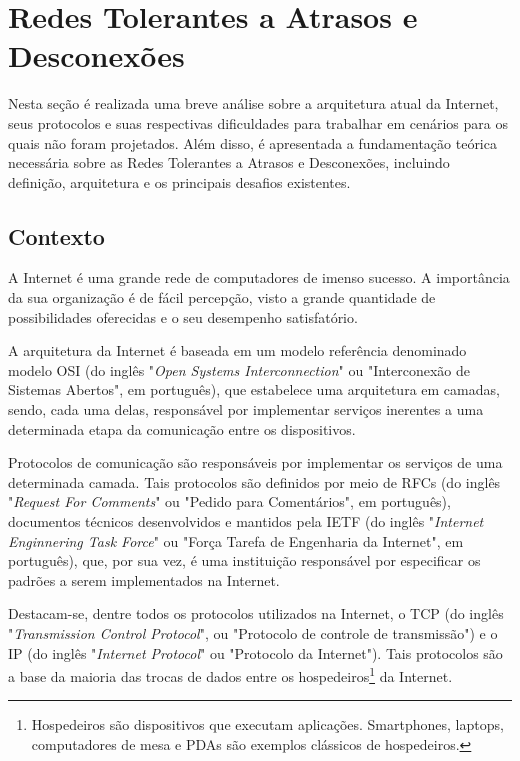 \section{Redes Tolerantes a Atrasos e Desconexões}\label{sec:DTN}

Nesta seção é realizada uma breve análise sobre a arquitetura atual da Internet, seus protocolos e suas respectivas dificuldades para trabalhar em cenários para os quais não foram projetados. Além disso, é apresentada a fundamentação teórica necessária sobre as Redes Tolerantes a Atrasos e Desconexões, incluindo definição, arquitetura e os principais desafios existentes.

\subsection{Contexto}\label{sec:DTN_contexto}

A Internet é uma grande rede de computadores de imenso sucesso. A importância da sua organização é de fácil percepção, visto a grande quantidade de possibilidades oferecidas e o seu desempenho satisfatório. 

A arquitetura da Internet é baseada em um modelo referência denominado modelo OSI (do inglês "\emph{Open Systems Interconnection}" ou "Interconexão de Sistemas Abertos", em português), que estabelece uma arquitetura em camadas, sendo, cada uma delas, responsável por implementar serviços inerentes a uma determinada etapa da comunicação entre os dispositivos. 

Protocolos de comunicação são responsáveis por implementar os serviços de uma determinada camada. Tais protocolos são definidos por meio de RFCs (do inglês "\emph{Request For Comments}" ou "Pedido para Comentários", em português), documentos técnicos desenvolvidos e mantidos pela  IETF (do inglês "\emph{Internet Enginnering Task Force}" ou "Força Tarefa de Engenharia da Internet", em português), que, por sua vez, é uma instituição responsável por especificar os padrões a serem implementados na Internet.

Destacam-se, dentre todos os protocolos utilizados na Internet, o TCP (do inglês "\emph{Transmission Control Protocol}", ou "Protocolo de controle de transmissão") e o IP (do inglês "\emph{Internet Protocol}" ou "Protocolo da Internet"). Tais protocolos são a base da maioria das trocas de dados entre os hospedeiros\footnote{Hospedeiros são dispositivos que executam aplicações. Smartphones, laptops, computadores de mesa e PDAs são exemplos clássicos de hospedeiros\cite{kurose2010redes}.} da Internet. 

